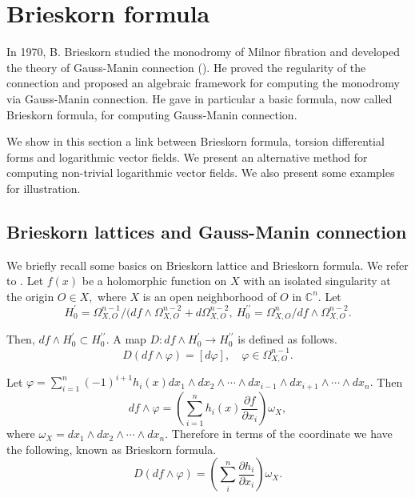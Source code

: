 \documentclass[pdftex]{arxsigma}
\begin{document}
\section{Brieskorn formula}

In 1970, B. Brieskorn studied the monodromy of Milnor fibration and developed the theory of Gauss-Manin connection (\cite{Br}). He proved the regularity of the connection and proposed an algebraic framework  for computing the monodromy via Gauss-Manin connection. He gave in particular a basic formula, now called Brieskorn formula, for computing Gauss-Manin connection. 

We show in this section a link between Brieskorn formula, torsion differential forms and logarithmic vector fields. We present an alternative method for computing non-trivial logarithmic vector fields. We also present some examples for illustration.

\subsection{Brieskorn lattices and Gauss-Manin connection}

We briefly recall some basics on Brieskorn lattice and Brieskorn formula. We refer to \cite{BS, Br, Schu}.
Let $f(x) $ be a holomorphic function on $X$ with an isolated singularity at the origin $ O \in X, $ where $X$ is an open neighborhood of $ O $ in $ {\mathbb C}^n. $
Let 
\begin{equation*}
H_{0}^{\prime} = \Omega_{X, O}^{n-1}/(df \wedge \Omega_{X,O}^{n-2} + d \Omega_{X,O}^{n-2}, \  H_{0}^{\prime\prime}=\Omega_{X,O}^{n}/df \wedge \Omega_{X,O}^{n-2}. 
\end{equation*}

Then, $df \wedge  H_{0}^{\prime} \subset H_{0}^{\prime\prime}. $
A map $D : df \wedge H_{0}^{\prime} \longrightarrow H_{0}^{\prime\prime} $ is defined as follows.
\begin{equation*}
D(df \wedge \varphi) = [d\varphi], \quad \varphi \in \Omega_{X,O}^{n-1}. 
\end{equation*}


Let $ \varphi= \sum_{i=1}^{n} (-1)^{i+1}h_i(x)dx_1 \wedge dx_2 \wedge \cdots \wedge dx_{i-1} \wedge dx_{i+1} \wedge \cdots \wedge dx_n. $ Then 
\begin{equation*}
df \wedge \varphi = \left(\sum_{i=1}^{n} h_i(x)\frac{\partial f}{\partial x_i}\right) \omega_X, 
\end{equation*}
where $ \omega_X=dx_1\wedge dx_2 \wedge \cdots \wedge dx_n. $ Therefore  in terms of the coordinate we have the following, known as Brieskorn formula.
\begin{equation*}
D(df\wedge \varphi) = \left(\sum_{i}^{n} \frac{\partial h_i}{\partial x_i}\right)\omega_X. \end{equation*}
\end{document}
